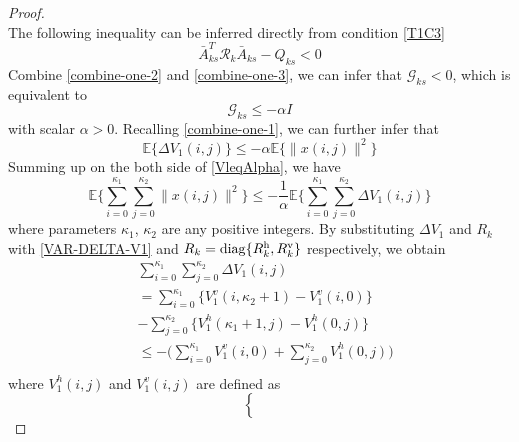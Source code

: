 \documentclass[conference]{IEEEtran}
\begin{document}
\begin{proof}
\begin{equation}
	\end{equation}
	The following inequality can be  inferred directly from condition \eqref{T1C3} 
	\begin{equation}\label{combine-one-3}
		\bar{A}^{T}_{ks}\mathcal{R}_{k}\bar{A}_{ks}-Q_{ks} < 0
	\end{equation}
	Combine \eqref{combine-one-2} and \eqref{combine-one-3}, we can infer that $\mathcal{G}_{ks}<0$, which is equivalent to 
	\begin{equation}
		\mathcal{G}_{ks} \leq -\alpha I
	\end{equation}
	with scalar $\alpha>0$.
	Recalling \eqref{combine-one-1}, we can further infer that
	\begin{equation}\label{VleqAlpha}
		\mathbb{E}\{\varDelta V_{1}(i,j) \} \leq-\alpha \mathbb{E}\{\|x(i,j)\|^{2} \}
	\end{equation}
	Summing up on the both side of \eqref{VleqAlpha}, we have
	\begin{equation} \label{levE}
		\mathbb{E}\Big\{\sum_{i=0}^{\kappa_{1}}\sum_{j=0}^{\kappa_{2}}  \|x(i,j)\|^{2} \Big\} \leq -\frac{1}{\alpha} \mathbb{E}\Big\{\sum_{i=0}^{\kappa_{1}}\sum_{j=0}^{\kappa_{2}}  \varDelta V_{1}(i,j)  \Big\}
	\end{equation}
	where parameters $\kappa_{1}$, $\kappa_{2}$ are any positive integers. By substituting $\varDelta V_{1}$ and $R_{k}$ with \eqref{VAR-DELTA-V1} and $R_{k}=\mathrm{diag}\{R^{\rm{h}}_{k},R^{\rm{v}}_{k}\}$ respectively, we obtain
	\begin{equation} \label{Vhv}
		\begin{split}
			&\sum_{i=0}^{\kappa_{1}}\sum_{j=0}^{\kappa_{2}}  \varDelta V_{1}(i,j)\\&= \sum_{i=0}^{\kappa_{1}}\big\{V^{v}_{1}(i,\kappa_{2}+1) - V^{v}_{1}(i,0) \big\}\\
			&-  \sum_{j=0}^{\kappa_{2}}\big\{V^{h}_{1}(\kappa_{1}+1,j) - V^{h}_{1}(0,j) \big\}\\
			&\leq -\big( \sum_{i=0}^{\kappa_{1}}V^{v}_{1}(i,0) + \sum_{j=0}^{\kappa_{2}}V^{h}_{1}(0,j)\big) \\
		\end{split}
	\end{equation} 
	where $V_{1}^{h}(i,j)$ and $V_{1}^{v}(i,j)$ are defined as   
	\begin{equation*}
	\left\{
	\begin{array}{lr}
	\begin{split}

\end{split}
\end{array}
\end{equation*}
\end{proof}
\end{document}

